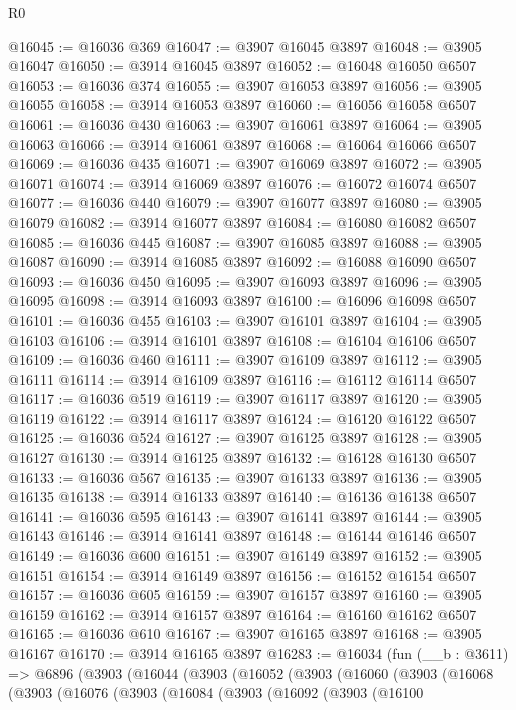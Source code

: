 \begin{lexlean}{R0}
\begin{coremodule}
@16045 := @16036 @369
@16047 := @3907 @16045 @3897
@16048 := @3905 @16047
@16050 := @3914 @16045 @3897
@16052 := @16048 @16050 @6507
@16053 := @16036 @374
@16055 := @3907 @16053 @3897
@16056 := @3905 @16055
@16058 := @3914 @16053 @3897
@16060 := @16056 @16058 @6507
@16061 := @16036 @430
@16063 := @3907 @16061 @3897
@16064 := @3905 @16063
@16066 := @3914 @16061 @3897
@16068 := @16064 @16066 @6507
@16069 := @16036 @435
@16071 := @3907 @16069 @3897
@16072 := @3905 @16071
@16074 := @3914 @16069 @3897
@16076 := @16072 @16074 @6507
@16077 := @16036 @440
@16079 := @3907 @16077 @3897
@16080 := @3905 @16079
@16082 := @3914 @16077 @3897
@16084 := @16080 @16082 @6507
@16085 := @16036 @445
@16087 := @3907 @16085 @3897
@16088 := @3905 @16087
@16090 := @3914 @16085 @3897
@16092 := @16088 @16090 @6507
@16093 := @16036 @450
@16095 := @3907 @16093 @3897
@16096 := @3905 @16095
@16098 := @3914 @16093 @3897
@16100 := @16096 @16098 @6507
@16101 := @16036 @455
@16103 := @3907 @16101 @3897
@16104 := @3905 @16103
@16106 := @3914 @16101 @3897
@16108 := @16104 @16106 @6507
@16109 := @16036 @460
@16111 := @3907 @16109 @3897
@16112 := @3905 @16111
@16114 := @3914 @16109 @3897
@16116 := @16112 @16114 @6507
@16117 := @16036 @519
@16119 := @3907 @16117 @3897
@16120 := @3905 @16119
@16122 := @3914 @16117 @3897
@16124 := @16120 @16122 @6507
@16125 := @16036 @524
@16127 := @3907 @16125 @3897
@16128 := @3905 @16127
@16130 := @3914 @16125 @3897
@16132 := @16128 @16130 @6507
@16133 := @16036 @567
@16135 := @3907 @16133 @3897
@16136 := @3905 @16135
@16138 := @3914 @16133 @3897
@16140 := @16136 @16138 @6507
@16141 := @16036 @595
@16143 := @3907 @16141 @3897
@16144 := @3905 @16143
@16146 := @3914 @16141 @3897
@16148 := @16144 @16146 @6507
@16149 := @16036 @600
@16151 := @3907 @16149 @3897
@16152 := @3905 @16151
@16154 := @3914 @16149 @3897
@16156 := @16152 @16154 @6507
@16157 := @16036 @605
@16159 := @3907 @16157 @3897
@16160 := @3905 @16159
@16162 := @3914 @16157 @3897
@16164 := @16160 @16162 @6507
@16165 := @16036 @610
@16167 := @3907 @16165 @3897
@16168 := @3905 @16167
@16170 := @3914 @16165 @3897
@16283 := @16034
    (fun (__b : @3611) =>
    @6896
      (@3903
        (@16044
          (@3903
            (@16052
              (@3903
                (@16060
                  (@3903
                    (@16068
                      (@3903
                        (@16076
                          (@3903
                            (@16084
                              (@3903
                                (@16092
                                  (@3903
                                    (@16100

\end{coremodule}
\end{lexlean}
